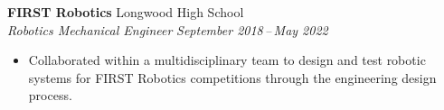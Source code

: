 \documentclass[11pt]{article}
\begin{document}
\vspace{2pt}

\noindent\textbf{FIRST Robotics} \hfill Longwood High School\\
\textit{Robotics Mechanical Engineer} \hfill \textit{September 2018\,--\,May 2022}
\begin{itemize}[leftmargin=10pt,itemsep=0pt,parsep=0pt,topsep=2pt,label=\textbullet]
\item Collaborated within a multidisciplinary team to design and test robotic systems for FIRST Robotics competitions through the engineering design process.
\end{itemize}
\end{document}
